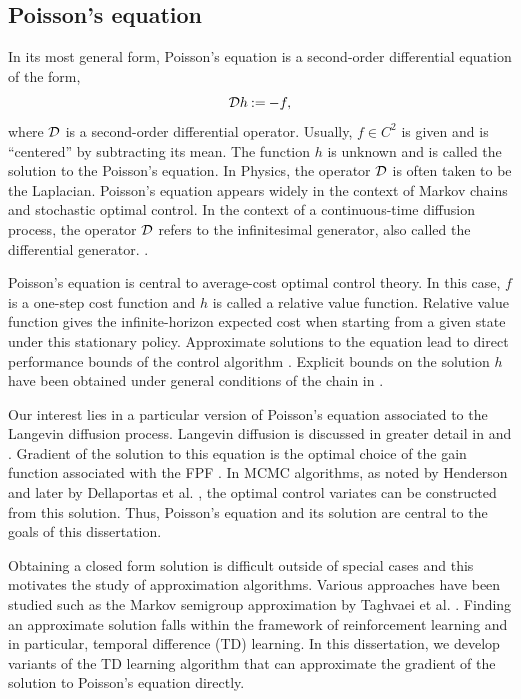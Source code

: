 \subsection{Poisson's equation} 
\label{s:poissons}
In its most general form, Poisson's equation is a second-order differential equation of the form,
\begin{equation*}
{\cal D} h \mathbin{:=} - f,
\end{equation*}
where ${\cal D}$ is a second-order differential operator. Usually, $f \in C^2$ is given and is ``centered'' by subtracting its mean. The function $h$ is unknown and is called the solution to the Poisson's equation. In Physics, the operator ${\cal D}$ is often taken to be the Laplacian. Poisson's equation appears widely in the context of Markov chains and stochastic optimal control. In the context of a continuous-time diffusion process, the operator ${\cal D}$ refers to the infinitesimal generator, also called the differential generator.  .

Poisson's equation is central to average-cost optimal control theory. In this case, $f$ is a one-step cost function and $h$ is called a relative value function.  Relative value function gives the infinite-horizon expected cost when starting from a given state under this stationary policy. Approximate solutions to the equation lead to direct performance bounds of the control algorithm \cite{ctcn}. Explicit bounds on the solution $h$ have been obtained under general conditions of the chain in \cite{}. 

Our interest lies in a particular version of Poisson's equation associated to the Langevin diffusion process. Langevin diffusion is discussed in greater detail in  and . Gradient of the solution to this equation is the optimal choice of the gain function associated with the FPF \cite{yanmehmey13}. In MCMC algorithms, as noted by Henderson \cite{henthesis97} and later by Dellaportas et al. \cite{delkon12}, the optimal control variates can be constructed from this solution. Thus, Poisson's equation and its solution are central to the goals of this dissertation. 

Obtaining a closed form solution is difficult outside of special cases and this motivates the study of approximation algorithms. Various approaches have been studied such as the Markov semigroup approximation by Taghvaei et al. \cite{tagmeh16a}. Finding an approximate solution falls within the framework of reinforcement learning and in particular, temporal difference (TD) learning. In this dissertation, we develop variants of the TD learning algorithm that can approximate the gradient of the solution to Poisson's equation directly.

